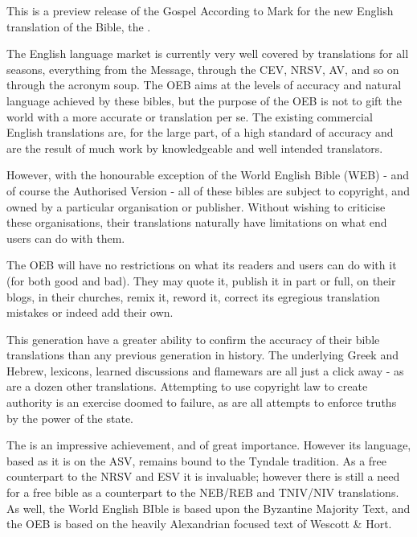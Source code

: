 

This is a preview release of the Gospel According to Mark for the 
new English translation of the Bible, the
.


The English language market is currently very well covered by
translations for all seasons, everything from the Message, through
the CEV, NRSV, AV, and so on through the acronym soup. The OEB aims
at the levels of accuracy and natural language achieved by these
bibles, but the purpose of the OEB is not to gift the world with a
more accurate or  translation per se. The existing
commercial English translations are, for the large part, of a high
standard of accuracy and are the result of much work by
knowledgeable and well intended translators.

However, with the honourable exception of the World English Bible
(WEB) - and of course the Authorised Version - all of these bibles
are subject to copyright, and owned by a particular organisation or
publisher. Without wishing to criticise these organisations, their
translations naturally have limitations on what end users can do
with them.

The OEB will have no restrictions on what its readers and users can
do with it (for both good and bad). They may quote it, publish it
in part or full, on their blogs, in their churches, remix it,
reword it, correct its egregious translation mistakes or indeed add
their own.


This generation have a greater ability to confirm the accuracy of
their bible translations than any previous generation in history.
The underlying Greek and Hebrew, lexicons, learned discussions and
flamewars are all just a click away - as are a dozen other
translations. Attempting to use copyright law to create authority
is an exercise doomed to failure, as are all attempts to enforce
truths by the power of the state.


The
\from[1]
is an impressive achievement, and of great importance. However its
language, based as it is on the ASV, remains bound to the Tyndale
tradition. As a free counterpart to the NRSV and ESV it is
invaluable; however there is still a need for a free bible as a
counterpart to the NEB/REB and TNIV/NIV translations. As well, the
World English BIble is based upon the Byzantine Majority Text, and
the OEB is based on the heavily Alexandrian focused text of Wescott
\& Hort.

